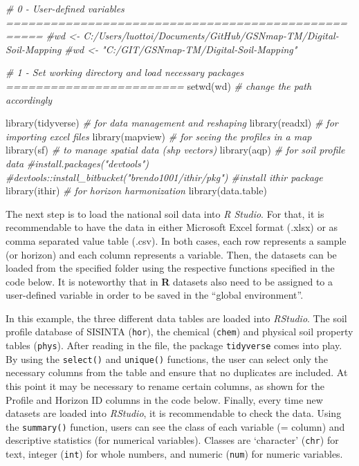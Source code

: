 \documentclass[
  10pt,
  b5paper,
  oneside]{book}
\newenvironment{Shaded}{\begin{snugshade}}{\end{snugshade}}
\newcommand{\CommentTok}[1]{\textcolor[rgb]{0.56,0.35,0.01}{\textit{#1}}}
\newcommand{\FunctionTok}[1]{\textcolor[rgb]{0.00,0.00,0.00}{#1}}
\newcommand{\NormalTok}[1]{#1}
\begin{document}
\begin{Shaded}
\begin{Highlighting}[]
\CommentTok{\# 0 {-} User{-}defined variables ===================================================}
\CommentTok{\#wd \textless{}{-} \textquotesingle{}C:/Users/luottoi/Documents/GitHub/GSNmap{-}TM/Digital{-}Soil{-}Mapping\textquotesingle{}}
\CommentTok{\#wd \textless{}{-} "C:/GIT/GSNmap{-}TM/Digital{-}Soil{-}Mapping"}

\CommentTok{\# 1 {-} Set working directory and load necessary packages ========================}
\FunctionTok{setwd}\NormalTok{(wd) }\CommentTok{\# change the path accordingly}

\FunctionTok{library}\NormalTok{(tidyverse) }\CommentTok{\# for data management and reshaping}
\FunctionTok{library}\NormalTok{(readxl) }\CommentTok{\# for importing excel files}
\FunctionTok{library}\NormalTok{(mapview) }\CommentTok{\# for seeing the profiles in a map}
\FunctionTok{library}\NormalTok{(sf) }\CommentTok{\# to manage spatial data (shp vectors) }
\FunctionTok{library}\NormalTok{(aqp) }\CommentTok{\# for soil profile data}
\CommentTok{\#install.packages("devtools") }
\CommentTok{\#devtools::install\_bitbucket("brendo1001/ithir/pkg") \#install ithir package}
\FunctionTok{library}\NormalTok{(ithir) }\CommentTok{\# for horizon harmonization}
\FunctionTok{library}\NormalTok{(data.table)}
\end{Highlighting}
\end{Shaded}

The next step is to load the national soil data into \emph{R Studio}. For that, it is recommendable to have the data in either Microsoft Excel format (.xlsx) or as comma separated value table (.csv). In both cases, each row represents a sample (or horizon) and each column represents a variable. Then, the datasets can be loaded from the specified folder using the respective functions specified in the code below. It is noteworthy that in \textbf{R} datasets also need to be assigned to a user-defined variable in order to be saved in the ``global environment''.

In this example, the three different data tables are loaded into \emph{RStudio}. The soil profile database of SISINTA (\texttt{hor}), the chemical (\texttt{chem}) and physical soil property tables (\texttt{phys}). After reading in the file, the package \texttt{tidyverse} comes into play. By using the \texttt{select()} and \texttt{unique()} functions, the user can select only the necessary columns from the table and ensure that no duplicates are included. At this point it may be necessary to rename certain columns, as shown for the Profile and Horizon ID columns in the code below.
Finally, every time new datasets are loaded into \emph{RStudio}, it is recommendable to check the data. Using the \texttt{summary()} function, users can see the class of each variable (= column) and descriptive statistics (for numerical variables). Classes are `character' (\texttt{chr}) for text, integer (\texttt{int}) for whole numbers, and numeric (\texttt{num}) for numeric variables.
\end{document}
